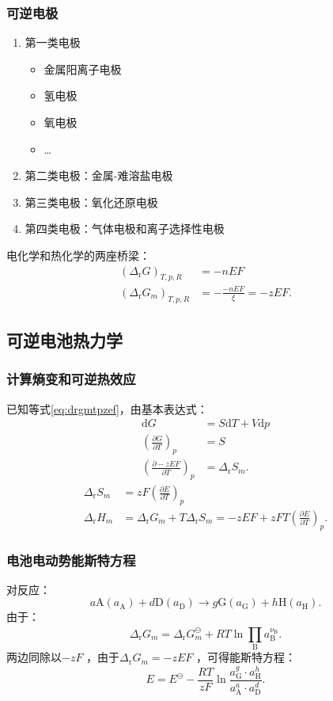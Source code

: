 \subsubsection{可逆电极}%
\label{ssub*:可逆电极}
\begin{enumerate}
    \item 第一类电极
        \begin{itemize}
            \item 金属阳离子电极
            \item 氢电极
            \item 氧电极
            \item \ldots 
        \end{itemize}
    \item 第二类电极：金属-难溶盐电极
    \item 第三类电极：氧化还原电极
    \item 第四类电极：气体电极和离子选择性电极
\end{enumerate}
电化学和热化学的两座桥梁：
\begin{align*}
    \left( \Delta_\text{r}G  \right)_{T,p,R} &= -nEF\\
    \left( \Delta_\text{r}G_{m}  \right)_{T,p,R} &= -\frac{-nEF}{\xi} = -zEF
.\end{align*}
\subsection{可逆电池热力学}%
\label{sub:可逆电池热力学}
\subsubsection{计算熵变和可逆热效应}%
\label{ssub*:计算熵变和可逆热效应}
已知等式\ref{eq:drgmtpzef}，由基本表达式：
\begin{align*}
    \mathrm{d}G &= S\mathrm{d}T + V\mathrm{d}p \\
    \left(\frac{\partial G}{\partial T}\right)_{p} &= S \\
    \left(\frac{\partial -zEF}{\partial T}\right)_{p} &= \Delta_\text{r}S_{m} 
.\end{align*}
\begin{align*}
    \Delta_\text{r}S_{m} &= zF\left(\frac{\partial E}{\partial T}\right)_{p}\\
    \Delta_\text{r}H_{m} &= \Delta_\text{r}G_{m} + T\Delta_\text{r}S_{m} = -zEF + zFT\left(\frac{\partial E}{\partial T}\right)_{p}  
.\end{align*}
\subsubsection{电池电动势能斯特方程}%
\label{ssub*:电池电动势能斯特方程}
对反应：\[
    a\text{A}\left( a_\text{A} \right) + d \text{D}\left( a_\text{D} \right) \to g\text{G}\left( a_\text{G} \right) + h\text{H}\left( a_\text{H} \right)
.\]
由于：\[
    \Delta_\text{r}G_{m} = \Delta_\text{r}G_{m}^\ominus  + RT\ln \prod_{\text{B}}^{} a_\text{B}^{\nu_\text{B}}
.\]
两边同除以$-zF$ ，由于$\Delta_\text{r}G_{m} = -zEF $ ，可得能斯特方程：
\[
    E = E^\ominus - \frac{RT}{zF}\ln \frac{a^{g}_\text{G}\cdot a^{h}_\text{H}}{a^{a}_\text{A}\cdot a^{d}_\text{D}}
.\]
